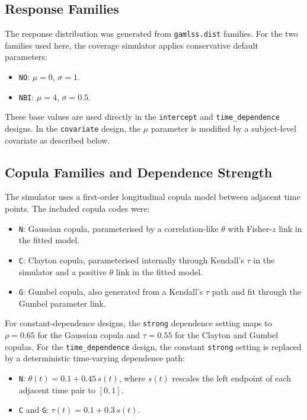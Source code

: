 \documentclass[11pt]{article}
\begin{document}
\subsection{Response Families}

The response distribution was generated from \texttt{gamlss.dist} families.
For the two families used here, the coverage simulator applies conservative
default parameters:

\begin{itemize}
  \item \texttt{NO}: \(\mu = 0\), \(\sigma = 1\).
  \item \texttt{NBI}: \(\mu = 4\), \(\sigma = 0.5\).
\end{itemize}

These base values are used directly in the \texttt{intercept} and
\texttt{time\_dependence} designs.  In the \texttt{covariate} design, the
\(\mu\) parameter is modified by a subject-level covariate as described below.

\subsection{Copula Families and Dependence Strength}

The simulator uses a first-order longitudinal copula model between adjacent
time points.  The included copula codes were:

\begin{itemize}
  \item \texttt{N}: Gaussian copula, parameterised by a correlation-like
  \(\theta\) with Fisher-\(z\) link in the fitted model.
  \item \texttt{C}: Clayton copula, parameterised internally through Kendall's
  \(\tau\) in the simulator and a positive \(\theta\) link in the fitted model.
  \item \texttt{G}: Gumbel copula, also generated from a Kendall's \(\tau\)
  path and fit through the Gumbel parameter link.
\end{itemize}

For constant-dependence designs, the \texttt{strong} dependence setting maps to
\(\rho = 0.65\) for the Gaussian copula and \(\tau = 0.55\) for the Clayton and
Gumbel copulas.  For the \texttt{time\_dependence} design, the constant
\texttt{strong} setting is replaced by a deterministic time-varying dependence
path:

\begin{itemize}
  \item \texttt{N}: \(\theta(t) = 0.1 + 0.45\,s(t)\), where \(s(t)\) rescales
  the left endpoint of each adjacent time pair to \([0,1]\).
  \item \texttt{C} and \texttt{G}: \(\tau(t) = 0.1 + 0.3\,s(t)\).
\end{itemize}
\end{document}

